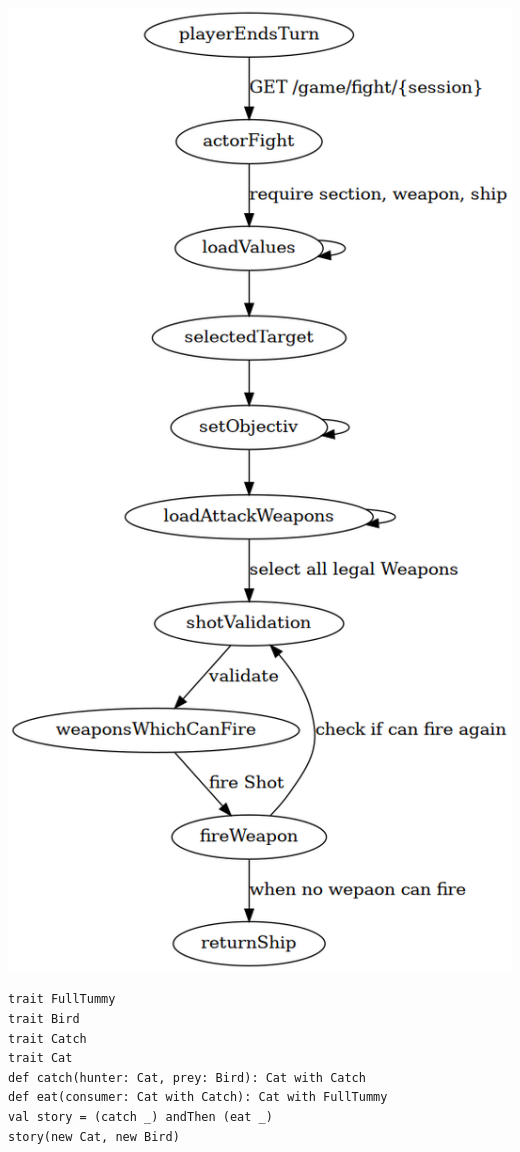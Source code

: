 \documentclass[11pt]{article}
\begin{document}
\begin{center}
\includegraphics[width=.9\linewidth]{actorFight.png}
\end{center}



\begin{verbatim}
trait FullTummy
trait Bird
trait Catch
trait Cat
def catch(hunter: Cat, prey: Bird): Cat with Catch
def eat(consumer: Cat with Catch): Cat with FullTummy
val story = (catch _) andThen (eat _)
story(new Cat, new Bird)
\end{verbatim}
\end{document}
